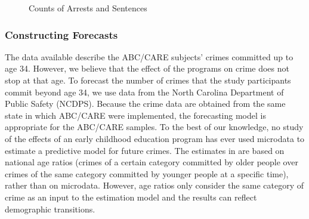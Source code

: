 \begin{figure}[H]
\caption{Counts of Arrests and Sentences}
\centering \label{fig:datagraph}
{}
\end{figure}

\subsubsection{Constructing Forecasts}

\noindent The data available describe the ABC/CARE subjects' crimes committed up to age 34. However, we believe that the effect of the programs on crime does not stop at that age. To forecast the number of crimes that the study participants commit beyond age 34, we use data from the North Carolina Department of Public Safety (NCDPS). Because the crime data are obtained from the same state in which ABC/CARE were implemented, the forecasting model is appropriate for the ABC/CARE samples. To the best of our knowledge, no study of the effects of an early childhood education program has ever used microdata to estimate a predictive model for future crimes. The estimates in \cite{Heckman_Moon_etal_2010_RateofReturn} are based on national age ratios (crimes of a certain category committed by older people over crimes of the same category committed by younger people at a specific time), rather than on microdata. However, age ratios only consider the same category of crime as an input to the estimation model and the results can reflect demographic transitions.

